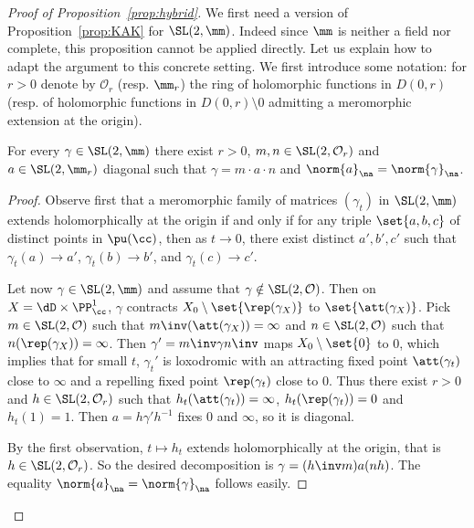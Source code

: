 \begin{proof}[Proof of Proposition~\ref{prop:hybrid}]
We first need a version of Proposition~\ref{prop:KAK} for $\SL(2, \mm)$. Indeed since $\mm$ is neither a field nor complete, this proposition cannot be applied directly. Let us explain how to adapt the argument to this concrete setting. We first introduce some notation: for $r>0$ denote by $\mathcal{O}_r$ (resp. $\mm_r$) the ring of holomorphic functions in $D(0, r)$ (resp. of holomorphic functions in $D(0, r)\setminus {0}$ admitting a meromorphic extension at the origin).

\begin{lemm}\label{lem:KAK holomorphe}
For every $\gamma\in \SL(2, \mm)$ there exist $r>0$, $m,n \in \SL(2,\mathcal{O}_r)$ and $a \in \SL(2, \mm_r)$ diagonal such that $\gamma= m\cdot a \cdot n$ and $\norm{a}_\na = \norm{\gamma}_\na$.
\end{lemm}

\begin{proof}
Observe first that a meromorphic family of matrices $(\gamma_t)$ in $\SL(2, \mm)$ extends holomorphically at the origin if and only if for any triple $\set{a,b,c}$ of distinct points in $\pu(\cc)$, then as $t\to 0$, there exist distinct $a',b',c'$ such that $\gamma_t(a)\to a'$, $\gamma_t(b)\to b'$, and $\gamma_t(c)\to c'$.

Let now $\gamma\in \SL(2, \mm)$ and assume that $\gamma\notin\SL(2, \mathcal{O})$. Then on $X = \dD\times \PP^1_\cc$, $\gamma$ contracts $X_0\setminus\set{\rep(\gamma_X)}$ to $\set{\att(\gamma_X)}$. Pick $m\in \SL(2, \mathcal{O})$ such that $m\inv(\att(\gamma_X)) = \infty$ and $n\in \SL(2, \mathcal{O})$ such that $n(\rep(\gamma_X)) = \infty$. Then $\gamma' = m\inv\gamma n\inv$ maps $X_0\setminus\set{0}$ to $0$, which implies that for small $t$, $\gamma_t'$ is loxodromic with an attracting fixed point $\att(\gamma_t)$ close to $\infty$ and a repelling fixed point $\rep(\gamma_t)$ close to $0$. Thus there exist $r>0$ and $h\in \SL(2, \mathcal{O}_r)$ such that $h_t(\att(\gamma_t)) =\infty$, $h_t(\rep(\gamma_t)) = 0$ and $h_t(1) =1$. Then $a= h\gamma'h^{-1}$ fixes 0 and $\infty$, so it is diagonal.

By the first observation, $t\mapsto h_t$ extends holomorphically at the origin, that is $h\in \SL(2, \mathcal{O}_r)$. So the desired decomposition is $\gamma = (h\inv m) a (n h)$. The equality $\norm{a}_\na = \norm{\gamma}_\na$ follows easily.
\end{proof}


\end{proof}
